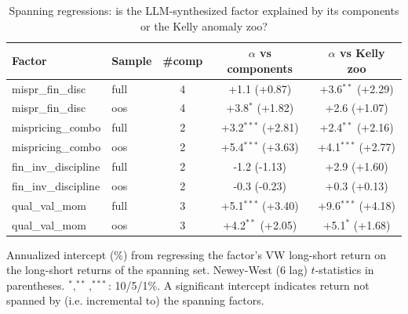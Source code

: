 \begin{table}[htbp]\centering
\caption{Spanning regressions: is the LLM-synthesized factor explained by its components or the Kelly anomaly zoo?}
\label{tab:spanning}
\begin{threeparttable}\footnotesize
\begin{tabular}{llccc}
\toprule
Factor & Sample & \#comp & $\alpha$ vs components & $\alpha$ vs Kelly zoo \\
\midrule
mispr\_fin\_disc & full & 4 & +1.1 (+0.87) & +3.6$^{**}$ (+2.29) \\
mispr\_fin\_disc & oos & 4 & +3.8$^{*}$ (+1.82) & +2.6 (+1.07) \\
mispricing\_combo & full & 2 & +3.2$^{***}$ (+2.81) & +2.4$^{**}$ (+2.16) \\
mispricing\_combo & oos & 2 & +5.4$^{***}$ (+3.63) & +4.1$^{***}$ (+2.77) \\
fin\_inv\_discipline & full & 2 & -1.2 (-1.13) & +2.9 (+1.60) \\
fin\_inv\_discipline & oos & 2 & -0.3 (-0.23) & +0.3 (+0.13) \\
qual\_val\_mom & full & 3 & +5.1$^{***}$ (+3.40) & +9.6$^{***}$ (+4.18) \\
qual\_val\_mom & oos & 3 & +4.2$^{**}$ (+2.05) & +5.1$^{*}$ (+1.68) \\
\bottomrule
\end{tabular}
\begin{tablenotes}\footnotesize
\item Annualized intercept (\%) from regressing the factor's VW long-short return on the long-short returns of the spanning set. Newey-West (6 lag) $t$-statistics in parentheses. $^{*},^{**},^{***}$: 10/5/1\%. A significant intercept indicates return not spanned by (i.e. incremental to) the spanning factors.
\end{tablenotes}
\end{threeparttable}
\end{table}